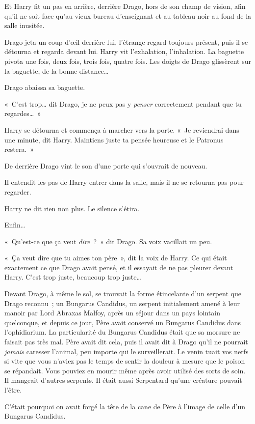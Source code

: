 Et Harry fit un pas en arrière, derrière Drago, hors de son champ de vision, afin qu'il ne soit face qu'au vieux bureau d'enseignant et au tableau noir au fond de la salle inusitée.

Drago jeta un coup d'œil derrière lui, l'étrange regard toujours présent, puis il se détourna et regarda devant lui.
Harry vit l'exhalation, l'inhalation.
La baguette pivota une fois, deux fois, trois fois, quatre fois.
Les doigts de Drago glissèrent sur la baguette, de la bonne distance…

Drago abaissa sa baguette.

«~C'est trop… dit Drago, je ne peux pas y \emph{penser} correctement pendant que tu regardes…~»

Harry se détourna et commença à marcher vers la porte.
«~Je reviendrai dans une minute, dit Harry.
Maintiens juste ta pensée heureuse et le Patronus restera.~»

\later

De derrière Drago vint le son d'une porte qui s'ouvrait de nouveau.

Il entendit les pas de Harry entrer dans la salle, mais il ne se retourna pas pour regarder.

Harry ne dit rien non plus.
Le silence s'étira.

Enfin…

«~Qu'est-ce que ça veut \emph{dire}~?~»
dit Drago.
Sa voix vacillait un peu.

«~Ça veut dire que tu aimes ton père~», dit la voix de Harry.
Ce qui était exactement ce que Drago avait pensé, et il essayait de ne pas pleurer devant Harry.
C'est trop juste, beaucoup trop juste…

Devant Drago, à même le sol, se trouvait la forme étincelante d'un serpent que Drago reconnu~; un Bungarus Candidus, un serpent initialement amené à leur manoir par Lord Abraxas Malfoy, après un séjour dans un pays lointain quelconque, et depuis ce jour, Père avait conservé un Bungarus Candidus dans l'ophidiarium.
La particularité du Bungarus Candidus était que sa morsure ne faisait pas très mal.
Père avait dit cela, puis il avait dit à Drago qu'il ne pourrait \emph{jamais} caresser l'animal, peu importe qui le surveillerait.
Le venin tuait vos nerfs si vite que vous n'aviez pas le temps de sentir la douleur à mesure que le poison se répandait.
Vous pouviez en mourir même après avoir utilisé des sorts de soin.
Il mangeait d'autres serpents.
Il était aussi Serpentard qu'une créature pouvait l'être.

C'était pourquoi on avait forgé la tête de la cane de Père à l'image de celle d'un Bungarus Candidus.

